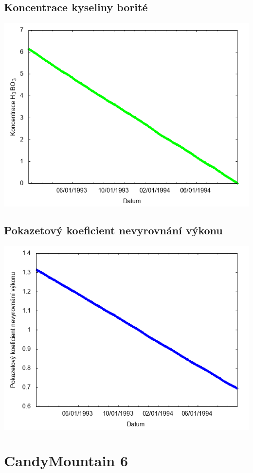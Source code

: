 \documentclass[a4paper,twoside,11pt]{article}
\begin{document}
\subsection*{Koncentrace kyseliny borité}
\begin{center}
\includegraphics[width=.8\textwidth]{graphs/CandyMountain_05_bc.png}
\end{center}

\subsection*{Pokazetový koeficient nevyrovnání výkonu}
\begin{center}
\includegraphics[width=.8\textwidth]{graphs/CandyMountain_05_fha.png}
\end{center}

\newpage
\section*{CandyMountain 6}
\end{document}
